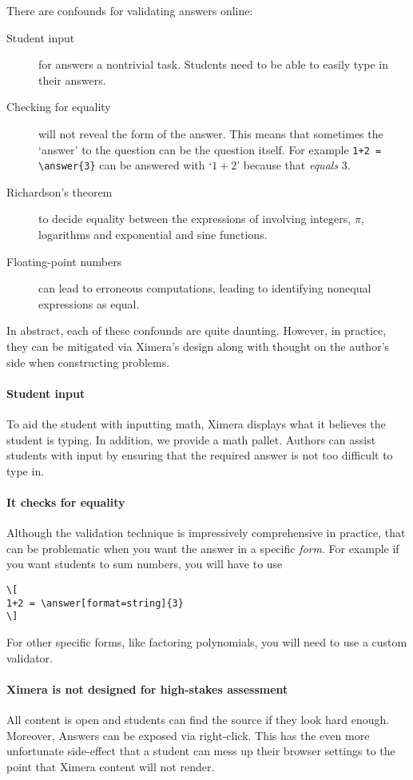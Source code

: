 \documentclass{ximera}
\begin{document}
There are confounds for validating answers online:
\begin{description}
  \item[Student input] for answers a nontrivial task. Students need to be able
    to easily type in their answers.
  \item[Checking for equality] will not reveal the form of the answer. This
    means that sometimes the `answer' to the question can be the question
    itself. For example  \verb!1+2 = \answer{3}! can be answered with `$1+2$'
    because
    that \textit{equals} $3$.
    \item[Richardson's theorem ]
    to decide equality between the expressions of involving integers, $\pi$,
    logarithms and exponential and sine functions.
  \item[Floating-point numbers] can lead to erroneous computations, leading to
    identifying nonequal expressions as equal.
\end{description}
In abstract, each of these confounds are quite daunting. However, in practice,
they can be mitigated via Ximera's design along with thought on the author's
side when constructing problems.

\paragraph{Student input} To aid the student with inputting math, Ximera
displays what it believes the student is typing. In addition, we provide a math
pallet. Authors can assist students with input by ensuring that the required
answer is not too difficult to type in.

\paragraph{It checks for equality}
Although the validation technique is impressively comprehensive in
practice, that can be problematic when you want the answer in a specific
\textit{form}. For example if you want students to sum numbers, you will have to use 
\begin{verbatim}
\[
1+2 = \answer[format=string]{3}
\]
\end{verbatim}
For other specific forms, like factoring polynomials, you will need to use a custom validator. 

\paragraph{Ximera is not designed for high-stakes assessment} All content is
open and students can find the source if they look hard enough. Moreover,
Answers can be exposed via right-click. This has the even more unfortunate
side-effect that a student can mess up their browser settings to the point that
Ximera content will not render.
\end{document}
